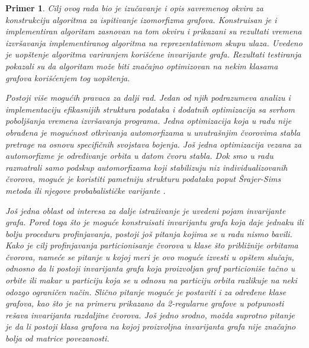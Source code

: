\documentclass[12pt,oneside]{memoir}
\newtheorem{example}{Primer}
\theoremstyle{definition}
\begin{document}
\begin{example}
  Cilj ovog rada bio je izučavanje i opis savremenog okvira za konstrukciju
  algoritma za ispitivanje izomorfizma grafova. Konstruisan je i implementiran
  algoritam zasnovan na tom okviru i prikazani su rezultati vremena izvršavanja
  implementiranog algoritma na reprezentativnom skupu ulaza. Uvedeno je
  uopštenje algoritma variranjem korišćene invarijante grafa. Rezultati
  testiranja pokazali su da algoritam može biti značajno optimizovan na nekim
  klasama grafova korišćenjem tog uopštenja.

  Postoji više mogućih pravaca za dalji rad. Jedan od njih podrazumeva analizu
  i implementaciju efikasnijih struktura podataka i dodatnih optimizacija sa
  svrhom poboljšanja vremena izvršavanja programa. Jedna optimizacija koja u
  radu nije obrađena je mogućnost otkrivanja automorfizama u unutrašnjim
  čvorovima stabla pretrage na osnovu specifičnih svojstava bojenja. Još jedna
  optimizacija vezana za automorfizme je određivanje orbita u datom čvoru
  stabla. Dok smo u radu razmatrali samo podskup automorfizama koji stabilizuju
  niz individualizovanih čvorova, moguće je koristiti pametniju strukturu
  podataka poput Šrajer-Sims metoda ili njegove probabalističke varijante
  \cite{Seress}.

  Još jedna oblast od interesa za dalje istraživanje je uvedeni pojam
  invarijante grafa. Pored toga što je moguće konstruisati invarijantu grafa
  koja daje jednaku ili bolju proceduru profinjavanja, postoji još pitanja
  kojima se u radu nismo bavili.  Kako je cilj profinjavanja particionisanje
  čvorova u klase što približnije orbitama čvorova, nameće se pitanje u kojoj
  meri je ovo moguće izvesti u opštem slučaju, odnosno da li postoji
  invarijanta grafa koja proizvoljan graf particioniše tačno u orbite ili makar
  u particiju koja se u odnosu na particiju orbita razlikuje na neki odozgo
  ograničen način. Slično pitanje moguće je postaviti i za određene klase
  grafova, kao što je na primeru prikazano da 2-regularne grafove u potpunosti
  rešava invarijanta razdaljine čvorova.  Još jedno srodno, možda suprotno
  pitanje je da li postoji klasa grafova na kojoj proizvoljna invarijanta grafa
  nije značajno bolja od matrice povezanosti.


\end{example}
\end{document}
